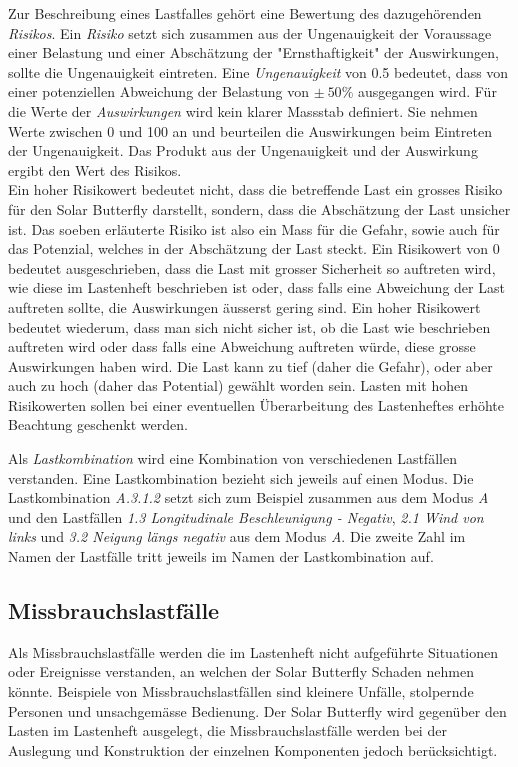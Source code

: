 Zur Beschreibung eines Lastfalles gehört eine Bewertung des dazugehörenden \emph{Risikos}. Ein \emph{Risiko} setzt sich zusammen aus der Ungenauigkeit der Voraussage einer Belastung und einer Abschätzung der "Ernsthaftigkeit" der Auswirkungen, sollte die Ungenauigkeit eintreten. Eine \emph{Ungenauigkeit} von 0.5 bedeutet, dass von einer potenziellen Abweichung der Belastung von $\pm\: 50\%$ ausgegangen wird. Für die Werte der \emph{Auswirkungen} wird kein klarer Massstab definiert. Sie nehmen Werte zwischen 0 und 100 an und beurteilen die Auswirkungen beim Eintreten der Ungenauigkeit. Das Produkt aus der Ungenauigkeit und der Auswirkung ergibt den Wert des Risikos.\\
Ein hoher Risikowert bedeutet nicht, dass die betreffende Last ein grosses Risiko für den Solar Butterfly darstellt, sondern, dass die Abschätzung der Last unsicher ist. Das soeben erläuterte Risiko ist also ein Mass für die Gefahr, sowie auch für das Potenzial, welches in der Abschätzung der Last steckt. Ein Risikowert von 0 bedeutet ausgeschrieben, dass die Last mit grosser Sicherheit so auftreten wird, wie diese im Lastenheft beschrieben ist oder, dass falls eine Abweichung der Last auftreten sollte, die Auswirkungen äusserst gering sind. Ein hoher Risikowert bedeutet wiederum, dass man sich nicht sicher ist, ob die Last wie beschrieben auftreten wird oder dass falls eine Abweichung auftreten würde, diese grosse Auswirkungen haben wird. Die Last kann zu tief (daher die Gefahr), oder aber auch zu hoch (daher das Potential) gewählt worden sein. Lasten mit hohen Risikowerten sollen bei einer eventuellen Überarbeitung des Lastenheftes erhöhte Beachtung geschenkt werden.

Als \emph{Lastkombination} wird eine Kombination von verschiedenen Lastfällen verstanden. Eine Lastkombination bezieht sich jeweils auf einen Modus. Die Lastkombination \emph{A.3.1.2} setzt sich zum Beispiel zusammen aus dem Modus \emph{A} und den Lastfällen \emph{1.3 Longitudinale Beschleunigung - Negativ}, \emph{2.1 Wind von links} und \emph{3.2 Neigung längs negativ} aus dem Modus \emph{A}. Die zweite Zahl im Namen der Lastfälle tritt jeweils im Namen der Lastkombination auf.

\subsection{Missbrauchslastfälle}
Als Missbrauchslastfälle werden die im Lastenheft nicht aufgeführte Situationen oder Ereignisse verstanden, an welchen der Solar Butterfly Schaden nehmen könnte. Beispiele von Missbrauchslastfällen sind kleinere Unfälle, stolpernde Personen und unsachgemässe Bedienung. Der Solar Butterfly wird gegenüber den Lasten im Lastenheft ausgelegt, die Missbrauchslastfälle werden bei der Auslegung und Konstruktion der einzelnen Komponenten jedoch berücksichtigt.

